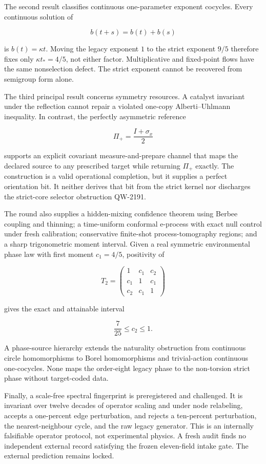 \documentclass[11pt,a4paper,openany]{report}
\begin{document}
The second result classifies continuous one-parameter exponent cocycles. Every continuous solution of

\[
b(t+s)=b(t)+b(s)
\]

is \(b(t)=\kappa t\). Moving the legacy exponent \(1\) to the strict exponent \(9/5\) therefore fixes only \(\kappa t_*=4/5\), not either factor. Multiplicative and fixed-point flows have the same nonselection defect. The strict exponent cannot be recovered from semigroup form alone.

The third principal result concerns symmetry resources. A catalyst invariant under the reflection cannot repair a violated one-copy Alberti--Uhlmann inequality. In contrast, the perfectly asymmetric reference

\[
\Pi_+=\frac{I+\sigma_x}{2}
\]

supports an explicit covariant measure-and-prepare channel that maps the declared source to any prescribed target while returning \(\Pi_+\) exactly. The construction is a valid operational completion, but it supplies a perfect orientation bit. It neither derives that bit from the strict kernel nor discharges the strict-core selector obstruction QW-2191.

The round also supplies a hidden-mixing confidence theorem using Berbee coupling and thinning; a time-uniform conformal e-process with exact null control under fresh calibration; conservative finite-shot process-tomography regions; and a sharp trigonometric moment interval. Given a real symmetric environmental phase law with first moment \(c_1=4/5\), positivity of

\[
T_2=
\begin{pmatrix}
1&c_1&c_2\\
c_1&1&c_1\\
c_2&c_1&1
\end{pmatrix}
\]

gives the exact and attainable interval

\[
\frac{7}{25}\le c_2\le 1.
\]

A phase-source hierarchy extends the naturality obstruction from continuous circle homomorphisms to Borel homomorphisms and trivial-action continuous one-cocycles. None maps the order-eight legacy phase to the non-torsion strict phase without target-coded data.

Finally, a scale-free spectral fingerprint is preregistered and challenged. It is invariant over twelve decades of operator scaling and under node relabeling, accepts a one-percent edge perturbation, and rejects a ten-percent perturbation, the nearest-neighbour cycle, and the raw legacy generator. This is an internally falsifiable operator protocol, not experimental physics. A fresh audit finds no independent external record satisfying the frozen eleven-field intake gate. The external prediction remains locked.
\end{document}
